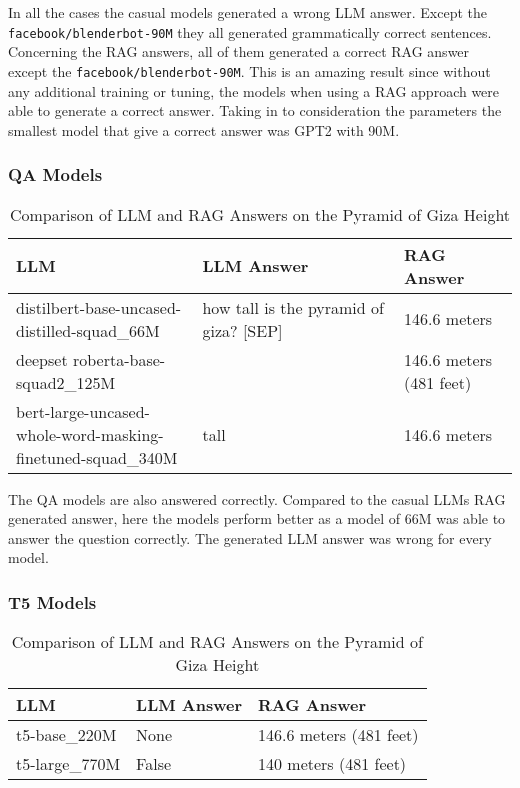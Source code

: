 \documentclass{wseas}
\begin{document}
In all the cases the casual models generated a wrong LLM answer. Except
the \texttt{facebook/blenderbot-90M} they all generated grammatically
correct sentences. Concerning the RAG answers, all of them generated a
correct RAG answer except the \texttt{facebook/blenderbot-90M}. This is
an amazing result since without any additional training or tuning, the
models when using a RAG approach were able to generate a correct answer.
Taking in to consideration the parameters the smallest model that give a
correct answer was GPT2 with 90M.


\subsubsection{QA Models}


\begin{table*}[htbp]
\centering
\begin{tabular}{|p{0.37\linewidth}|p{0.40\linewidth}|p{0.23\linewidth}|}
\hline
\textbf{LLM} & \textbf{LLM Answer} & \textbf{RAG Answer} \\ \hline
distilbert-base-uncased-distilled-squad\_66M & how tall is the pyramid of giza? {[}SEP{]} & 146.6 meters \\ \hline
deepset roberta-base-squad2\_125M &  & 146.6 meters (481 feet) \\ \hline
bert-large-uncased-whole-word-masking-finetuned-squad\_340M & tall & 146.6 meters \\ \hline
\end{tabular}
\caption{Comparison of LLM and RAG Answers on the Pyramid of Giza Height}
\end{table*}

The QA models are also answered correctly. Compared to the casual LLMs
RAG generated answer, here the models perform better as a model of 66M
was able to answer the question correctly. The generated LLM answer was
wrong for every model.

\subsubsection{T5 Models}

\begin{table*}[htbp]
\centering
\begin{tabular}{|l|l|l|}
\hline
\textbf{LLM} & \textbf{LLM Answer} & \textbf{RAG Answer} \\ \hline
t5-base\_220M & None & 146.6 meters (481 feet) \\ \hline
t5-large\_770M & False & 140 meters (481 feet) \\ \hline
\end{tabular}
\caption{Comparison of LLM and RAG Answers on the Pyramid of Giza Height}
\end{table*}
\end{document}
